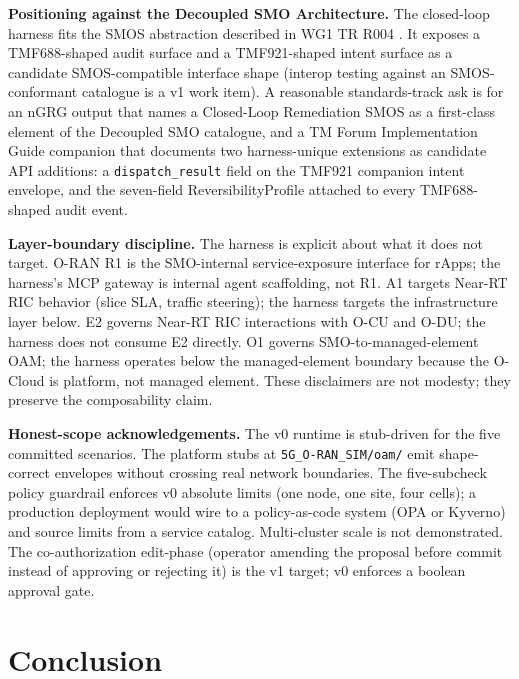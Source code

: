 \documentclass[twocolumn,10pt,a4paper]{article}
\begin{document}
\textbf{Positioning against the Decoupled SMO Architecture.} The closed-loop harness fits the SMOS abstraction described in WG1 TR R004 \cite{oran_decoupled_smo}. It exposes a TMF688-shaped audit surface and a TMF921-shaped intent surface as a candidate SMOS-compatible interface shape (interop testing against an SMOS-conformant catalogue is a v1 work item). A reasonable standards-track ask is for an nGRG output that names a Closed-Loop Remediation SMOS as a first-class element of the Decoupled SMO catalogue, and a TM Forum Implementation Guide companion that documents two harness-unique extensions as candidate API additions: a \texttt{dispatch\_result} field on the TMF921 companion intent envelope, and the seven-field ReversibilityProfile attached to every TMF688-shaped audit event.

\textbf{Layer-boundary discipline.} The harness is explicit about what it does not target. O-RAN R1 \cite{oran_r1} is the SMO-internal service-exposure interface for rApps; the harness's MCP gateway is internal agent scaffolding, not R1. A1 \cite{oran_a1} targets Near-RT RIC behavior (slice SLA, traffic steering); the harness targets the infrastructure layer below. E2 \cite{oran_e2} governs Near-RT RIC interactions with O-CU and O-DU; the harness does not consume E2 directly. O1 \cite{oran_o1} governs SMO-to-managed-element OAM; the harness operates below the managed-element boundary because the O-Cloud is platform, not managed element. These disclaimers are not modesty; they preserve the composability claim.

\textbf{Honest-scope acknowledgements.} The v0 runtime is stub-driven for the five committed scenarios. The platform stubs at \texttt{5G\_O-RAN\_SIM/oam/} emit shape-correct envelopes without crossing real network boundaries. The five-subcheck policy guardrail enforces v0 absolute limits (one node, one site, four cells); a production deployment would wire to a policy-as-code system (OPA or Kyverno) and source limits from a service catalog. Multi-cluster scale is not demonstrated. The co-authorization edit-phase (operator amending the proposal before commit instead of approving or rejecting it) is the v1 target; v0 enforces a boolean approval gate.

\section{Conclusion}
\label{sec:conclude}
\end{document}
